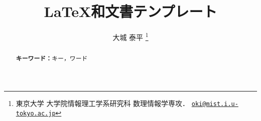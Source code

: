 \documentclass[dvipdfmx,japanese,jlreq_notes]{jlreq}
\title{\LaTeX{}和文書テンプレート}
\author{大城 泰平%
  \texorpdfstring{\thanks{
    東京大学 大学院情報理工学系研究科 数理情報学専攻．
    \href{mailto:oki@mist.i.u-tokyo.ac.jp}{\nolinkurl{oki@mist.i.u-tokyo.ac.jp}}
  }}{}
}
\newcommand{\mykeywords}{キー，ワード}
\begin{document}
\maketitle

\begin{abstract}
  

  \bigskip\noindent\textbf{キーワード：}\mykeywords{}
\end{abstract}



\printbibliography[heading=bibintoc]
\end{document}
